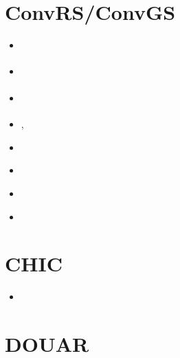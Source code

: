 \section{ConvRS/ConvGS} 

\begin{small}
\begin{itemize}
\item[\twothousandeight] \textcite{yosh08}
\item[\twothousandnine] \textcite{yona09}
\item[\twothousandten]  \textcite{mohy10}
\item[\twothousandtwelve] \textcite{yoth12}, \textcite{yosh12}
\item[\twothousandthirteen] \textcite{yosh13}
\item[\twothousandtwenty] \textcite{yosy20}
\item[\twothousandtwentythree] \textcite{yosh23}
\item[2026] \textcite{yosh26}
\end{itemize}
\end{small} 


\section{CHIC}  

\begin{small}
\begin{itemize}
\item[2015] \textcite{norv15}
\end{itemize}
\end{small}


\section{DOUAR}

